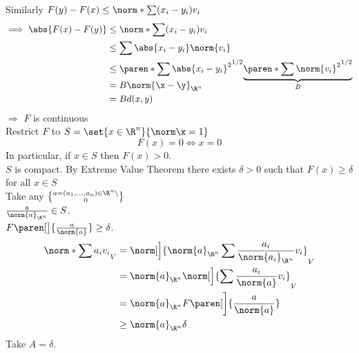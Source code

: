 Similarly $F(y)-F(x)\leq\norm*{\sum(x_i-y_i)v_i}$
\begin{align*}
\implies \abs{F(x)-F(y)} &\leq \norm*{\sum(x_i-y_i)v_i} \\
&\leq \sum\abs{x_i-y_i}\norm{v_i} \\
&\leq \paren*{\sum\abs{x_i-y_i}^2}^{1/2}\smash{\underbrace{\paren*{\sum\norm{v_i}^2}^{1/2}}_B} \\
&= B\norm{\x-\y}_{\R^n} \\
&= B d(x,y)
\end{align*}
$\Longrightarrow$ $F$ is continuous \\
Restrict $F$ to $S=\set{x\in\R^n}{\norm\x=1}$
\[ F(x) = 0 \iff x = 0 \]
In particular, if $x\in S$ then $F(x)>0$. \\
$S$ is compact.  By Extreme Value Theorem there exists $\delta>0$ such that $F(x)\geq\delta$ for all $x\in S$ \\
Take any $a=(a_1,\dotsc,a_n)\in\R^n\setminus\brace0$ \\
$\frac{a}{\norm{a}_{\R^n}}\in S$. \\
$F\paren[\big]{\frac{a}{\norm{a}}}\geq\delta$.%
\begin{align*}
\norm*{\sum a_iv_i}_V &= \norm[\Big]{\norm{a}_{\R^n}\sum\frac{a_i}{\norm{a_i}_{\R^n}}v_i}_V \\
&= \norm{a}_{\R^n} \norm[\Big]{\sum\frac{a_i}{\norm{a}}v_i}_V \\
&= \norm{a}_{\R^n} F\paren[\bigg]{\frac{a}{\norm{a}}} \\
&\geq \norm{a}_{\R^n}\delta
\end{align*}
Take $A=\delta$.
